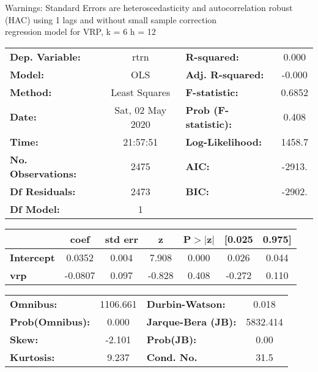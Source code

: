 Warnings: \newline
 [1] Standard Errors are heteroscedasticity and autocorrelation robust (HAC) using 1 lags and without small sample correction\\ 

regression model for VRP, k = 6 h = 12\begin{center}
\begin{tabular}{lclc}
\toprule
\textbf{Dep. Variable:}    &       rtrn       & \textbf{  R-squared:         } &     0.000   \\
\textbf{Model:}            &       OLS        & \textbf{  Adj. R-squared:    } &    -0.000   \\
\textbf{Method:}           &  Least Squares   & \textbf{  F-statistic:       } &    0.6852   \\
\textbf{Date:}             & Sat, 02 May 2020 & \textbf{  Prob (F-statistic):} &    0.408    \\
\textbf{Time:}             &     21:57:51     & \textbf{  Log-Likelihood:    } &    1458.7   \\
\textbf{No. Observations:} &        2475      & \textbf{  AIC:               } &    -2913.   \\
\textbf{Df Residuals:}     &        2473      & \textbf{  BIC:               } &    -2902.   \\
\textbf{Df Model:}         &           1      & \textbf{                     } &             \\
\bottomrule
\end{tabular}
\begin{tabular}{lcccccc}
                   & \textbf{coef} & \textbf{std err} & \textbf{z} & \textbf{P$> |$z$|$} & \textbf{[0.025} & \textbf{0.975]}  \\
\midrule
\textbf{Intercept} &       0.0352  &        0.004     &     7.908  &         0.000        &        0.026    &        0.044     \\
\textbf{vrp}       &      -0.0807  &        0.097     &    -0.828  &         0.408        &       -0.272    &        0.110     \\
\bottomrule
\end{tabular}
\begin{tabular}{lclc}
\textbf{Omnibus:}       & 1106.661 & \textbf{  Durbin-Watson:     } &    0.018  \\
\textbf{Prob(Omnibus):} &   0.000  & \textbf{  Jarque-Bera (JB):  } & 5832.414  \\
\textbf{Skew:}          &  -2.101  & \textbf{  Prob(JB):          } &     0.00  \\
\textbf{Kurtosis:}      &   9.237  & \textbf{  Cond. No.          } &     31.5  \\
\bottomrule
\end{tabular}
\end{center}

